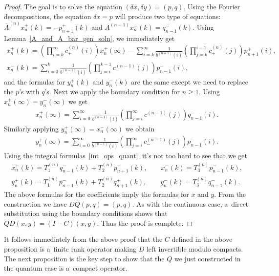 \begin{proof}
The goal is to solve the equation $(\delta x, \delta y) = (p,q)$.
Using the Fourier decompositions, the equation $\delta x = p$ will produce two type of equations:
$\overline{A}^{(n)}x_n^+(k) = -p_{n+1}^+(k)$ and $A^{(n-1)}x_n^-(k) = q_{n-1}^-(k)$.
Using Lemma~\ref{A_and_A_bar_gen_soln}, we immediately get
\begin{gather*}
x_n^+(k) = \left(\prod\limits_{i=k}^\infty c_+^{(n)}(i)\right)x_n^+(\infty) -
\sum\limits_{i=k}^\infty\frac{1}{b^{(n+1)}(i)}\left(\prod\limits_{j=k}^{i-1}c_+^{(n)}(j)\right)p_{n+1}^+(i),
\\
x_n^-(k) = \sum\limits_{i=0}^k \frac{1}{b^{(n-1)}(i)}\left(\prod\limits_{j=i}^{k-1} c_-^{(n-1)}(j)\right)p_{n-1}^-(i),
\end{gather*}
and the formulas for $y_n^+(k)$ and $y_n^-(k)$ are the same except we need to replace the $p$'s with $q$'s.
Next we apply the boundary condition for $n\ge 1$.
Using $x_n^+(\infty) = y_n^-(\infty)$ we get
\begin{gather*}
x_n^+(\infty) = \sum\limits_{i=0}^\infty \frac{1}{b^{(n-1)}(i)}\left(\prod\limits_{j=i}^\infty
c_-^{(n-1)}(j)\right)q_{n-1}^-(i).
\end{gather*}
Similarly applying $y_n^+(\infty) = x_n^-(\infty)$ we obtain
\begin{gather*}
y_n^+(\infty) = \sum\limits_{i=0}^\infty \frac{1}{b^{(n-1)}(i)}\left(\prod\limits_{j=i}^\infty
c_-^{(n-1)}(j)\right)p_{n-1}^-(i).
\end{gather*}
Using the integral formulas~\eqref{int_ops_quant}, it's not too hard to see that we get
\begin{gather*}
x_n^+(k) = T_1^{(n)}q_{n-1}^-(k) + T_2^{(n)}p_{n+1}^+(k),
\qquad
x_n^-(k) = T_3^{(n)}p_{n-1}^-(k),
\\
y_n^+(k) = T_1^{(n)}p_{n-1}^-(k) + T_2^{(n)}q_{n+1}^+(k),
\qquad
y_n^-(k) = T_3^{(n)}q_{n-1}^-(k).
\end{gather*}
The above formulas for the coef\/f\/icients imply the formulas for ${x}$ and ${y}$.
From the construction we have $DQ(p,q)=(p,q)$.
As with the continuous case, a~direct substitution using the boundary conditions shows that $QD(x,y) = (I-C)(x,y)$.
Thus the proof is complete.
\end{proof}

It follows immediately from the above proof that the $C$ def\/ined in the above proposition is a~f\/inite rank operator
making $D$ left invertible modulo compacts.
The next proposition is the key step to show that the $Q$ we just constructed in the quantum case is a~compact operator.

